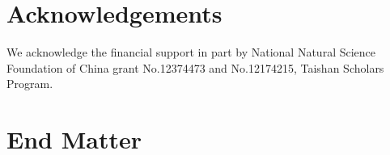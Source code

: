 \documentclass[longbibliography, aps, prx, amsmath, amssymb, amsfonts, twocolumn,superscriptaddress, footinbib]{revtex4-1}
\begin{document}
    \section*{Acknowledgements}
	We acknowledge the financial support in part by National Natural Science Foundation of China grant No.12374473 and No.12174215, Taishan Scholars Program.

	
	

    \newpage

	\section*{End Matter~\label{sec:method}}

	
\end{document}
